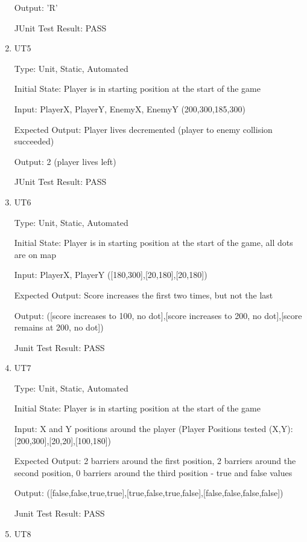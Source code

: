 \documentclass[12pt, titlepage]{article}
\begin{document}
\begin{enumerate}
Output: 'R'

JUnit Test Result: PASS

\item{\label{ut5}{UT5}\\}

Type: Unit, Static, Automated
					
Initial State: Player is in starting position at the start of the game
					
Input: PlayerX, PlayerY, EnemyX, EnemyY (200,300,185,300)
					
Expected Output: Player lives decremented (player to enemy collision succeeded)
					
Output: 2 (player lives left)

JUnit Test Result: PASS

\item{\label{ut6}{UT6}\\}

Type: Unit, Static, Automated
					
Initial State: Player is in starting position at the start of the game, all dots are on map
					
Input: PlayerX, PlayerY ([180,300],[20,180],[20,180])
					
Expected Output: Score increases the first two times, but not the last
					
Output: ([score increases to 100, no dot],[score increases to 200, no dot],[score remains at 200, no dot])

Junit Test Result: PASS

\item{\label{ut7}{UT7}\\}

Type: Unit, Static, Automated
					
Initial State: Player is in starting position at the start of the game
					
Input: X and Y positions around the player (Player Positions tested (X,Y): [200,300],[20,20],[100,180])
					
Expected Output: 2 barriers around the first position, 2 barriers around the second position, 0 barriers around the third position - true and false values
					
Output: ([false,false,true,true],[true,false,true,false],[false,false,false,false])

Junit Test Result: PASS

\item{\label{ut8}{UT8}\\}


\end{enumerate}
\end{document}
